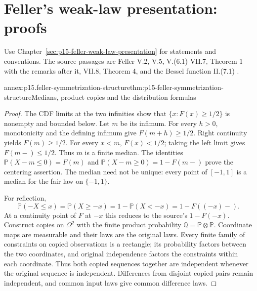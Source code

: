 \section{Feller's weak-law presentation: proofs}
\label{sec:annex-p15-feller-weak-law-presentation}

Use Chapter~\ref{sec:p15-feller-weak-law-presentation} for statements
and conventions. The source passages are Feller V.2, V.5, V.(6.1)
VII.7, Theorem 1 with the remarks after it, VII.8, Theorem 4, and the
Bessel function II.(7.1)
\cite[pp.~58, 137, 148--150, 234--236, 241]{Feller1971ProbabilityII}.

\begin{annexitem}{annex:p15.feller-symmetrization-structure}{thm:p15-feller-symmetrization-structure}{Medians, product copies and the distribution formulas}
\begin{proof}
The CDF limits at the two infinities show that
\(\{x:F(x)\geq1/2\}\) is nonempty and bounded below. Let \(m\)
be its infimum. For every \(h>0\), monotonicity and the defining
infimum give \(F(m+h)\geq1/2\). Right continuity yields
\(F(m)\geq1/2\). For every \(x<m\), \(F(x)<1/2\);
taking the left limit gives \(F(m-)\leq1/2\).
Thus \(m\) is a finite median. The identities
\(\mathbb P(X-m\leq0)=F(m)\) and
\(\mathbb P(X-m\geq0)=1-F(m-)\) prove the centering assertion.
The median need not be unique: every point of \([-1,1]\) is a
median for the fair law on \(\{-1,1\}\).

For reflection,
\[
 \mathbb P(-X\leq x)=\mathbb P(X\geq-x)
                     =1-\mathbb P(X<-x)=1-F((-x)-).
\]
At a continuity point of \(F\) at \(-x\) this reduces to the
source's \(1-F(-x)\).
Construct copies on \(\Omega^2\) with the finite product
probability \(\mathbb Q=\mathbb P\otimes\mathbb P\).
Coordinate maps are measurable and their laws are the original laws.
Every finite family of constraints on copied observations is a
rectangle; its probability factors between the two coordinates,
and original independence factors the constraints within each
coordinate. Thus both copied sequences together are independent
whenever the original sequence is independent. Differences from
disjoint copied pairs remain independent, and common input laws
give common difference laws.


\end{proof}
\end{annexitem}
